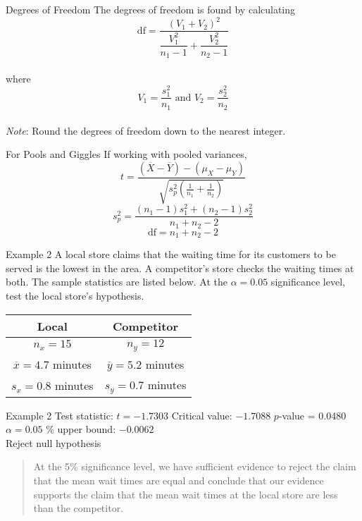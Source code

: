 \documentclass[t]{beamer}
\begin{document}
\begin{frame}{Degrees of Freedom}
The degrees of freedom is found by calculating
\[\text{df} = \dfrac{\left(V_1+V_2\right)^2}{\dfrac{V_1^2}{n_1-1} + \dfrac{V_2^2}{n_2-1}}\]
\newline\\
where
\[V_1 = \frac{s_1^2}{n_1} \text{ and } V_2 = \frac{s_2^2}{n_2}\]
\newline\\
\emph{Note}: Round the degrees of freedom down to the nearest integer.
\end{frame}

\begin{frame}{For Pools and Giggles}
If working with pooled variances,
\[t = \frac{(\overline{X}-\overline{Y}) - (\mu_X - \mu_Y)}{\sqrt{s_p^2\left(\frac{1}{n_1}+\frac{1}{n_2}\right)}}\]
\bigskip
\[s_p^2 = \frac{(n_1-1)s_1^2+(n_2-1)s_2^2}{n_1+n_2-2}\]
\bigskip
\[\text{df} = n_1+n_2-2\]
\end{frame}

\begin{frame}{Example 2}
A local store claims that the waiting time for its customers to be served is the lowest in the area. A competitor's store checks the waiting times at both. The sample statistics are listed below. At the $\alpha = 0.05$ significance level, test the local store's hypothesis.	\newline\\
\begin{center}
\begin{tabular}{c|c}
Local & Competitor \\ \hline
$n_x = 15$ & $n_y = 12$	\\
$\overline{x} = 4.7$ minutes & $\overline{y} = 5.2$ minutes \\
$s_x = 0.8$ minutes & $s_y = 0.7$ minutes
\end{tabular}
\end{center}
\end{frame}

\begin{frame}{Example 2}
Test statistic: $t = -1.7303$ \quad Critical value: $-1.7088$\newline
$p$-value = 0.0480 \quad $\alpha = 0.05$	\% upper bound: $-0.0062$	\newline\\	\pause
Reject null hypothesis	\newline\\	\pause
\begin{quote}
At the 5\% significance level, we have sufficient evidence to reject the claim that the mean wait times are equal and conclude that our evidence supports the claim that the mean wait times at the local store are less than the competitor.
\end{quote}
\end{frame}
\end{document}
